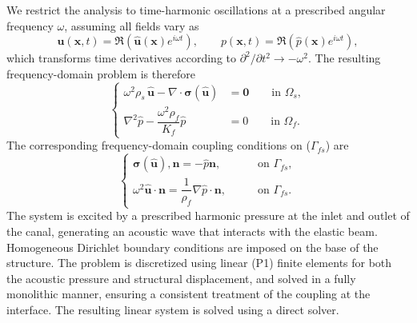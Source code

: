 \documentclass{article}
\begin{document}
We restrict the analysis to time-harmonic oscillations at a prescribed angular frequency $\omega$, assuming all fields vary as
\begin{equation}
\mathbf{u}(\mathbf{x},t) = \Re \left( \hat{\mathbf{u}}(\mathbf{x}) e^{i \omega t} \right),
\qquad
p(\mathbf{x},t) = \Re \left( \hat{p}(\mathbf{x}) e^{i \omega t} \right),
\end{equation}
which transforms time derivatives according to $\partial^2 / \partial t^2 \rightarrow -\omega^2$. The resulting frequency-domain problem is therefore
\begin{equation}
\begin{cases}

 \omega^2 \rho_s \, \hat{\mathbf{u}} - \nabla \cdot \boldsymbol{\sigma}(\hat{\mathbf{u}}) &= \mathbf{0} \qquad \text{in } \Omega_s, \\
 \nabla^2 \hat{p} - \dfrac{\omega^2 \rho_f}{K_f} \hat{p} &= 0 \qquad \text{in } \Omega_f.
  \end{cases}
  \end{equation}
  The corresponding frequency-domain coupling conditions on ($\Gamma_{fs}$) are
\begin{equation}
\begin{cases}
\boldsymbol{\sigma}(\hat{\mathbf{u}}) , \mathbf{n} = - \hat{p}  \mathbf{n},
& \qquad \text{on } \Gamma_{fs}, \\
\omega^2 \hat{\mathbf{u}} \cdot \mathbf{n}
= \dfrac{1}{\rho_f} \nabla \hat{p} \cdot \mathbf{n},
& \qquad \text{on } \Gamma_{fs}.
\end{cases}
\end{equation}
The system is excited by a prescribed harmonic pressure at the inlet and outlet of the canal, generating an acoustic wave that interacts with the elastic beam. Homogeneous Dirichlet boundary conditions are imposed on the base of the structure. The problem is discretized using linear (P1) finite elements for both the acoustic pressure and structural displacement, and solved in a fully monolithic manner, ensuring a consistent treatment of the coupling at the interface. The resulting linear system is solved using a direct solver.\\
\\
\end{document}
